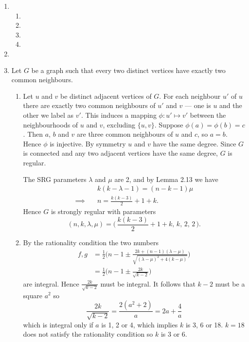 \documentclass[a4paper, 12pt]{article}
\begin{document}
\begin{enumerate}

\item \begin{enumerate}

\item 

\item

\item

\item

\end{enumerate}

\item

\item Let \(G\) be a graph such that every two distinct vertices have exactly two common neighbours.

\begin{enumerate}

\item Let \(u\) and \(v\) be distinct adjacent vertices of \(G\). For each neighbour \(u'\) of \(u\) there are exactly two common neighbours of \(u'\) and \(v\) --- one is \(u\) and the other we label as \(v'\). This induces a mapping \(\phi\colon u'\mapsto v'\) between the neighbourhoods of \(u\) and \(v\), excluding \(\{u,v\}\). Suppose \(\phi(a)=\phi(b)=c\). Then \(a\), \(b\) and \(v\) are three common neighbours of \(u\) and \(c\), so \(a=b\). Hence \(\phi\) is injective. By symmetry \(u\) and \(v\) have the same degree. Since \(G\) is connected and any two adjacent vertices have the same degree, \(G\) is regular.

The SRG parameters \(\lambda\) and \(\mu\) are 2, and by Lemma 2.13 we have
\begin{align*}
&k(k-\lambda-1)=(n-k-1)\mu\\
\implies\quad&n=\frac{k(k-3)}2+1+k.
\end{align*}
Hence \(G\) is strongly regular with parameters
\[(n,k,\lambda,\mu)=\bigg(\,\frac{k(k-3)}2+1+k,\,k,\,2,\,2\,\bigg).\]

\item By the rationality condition the two numbers
\begin{align*}
f,g&=\frac12\bigg(n-1\pm\frac{2k+(n-1)(\lambda-\mu)}{\sqrt{(\lambda-\mu)^2+4(k-\mu)}}\bigg)\\
&=\frac12\bigg(n-1\pm\frac{2k}{\sqrt{k-2}}\bigg)
\end{align*}
are integral. Hence \(\frac{2k}{\sqrt{k-2}}\) must be integral. It follows that \(k-2\) must be a square \(a^2\) so
\[\frac{2k}{\sqrt{k-2}}=\frac{2(a^2+2)}{a}=2a+\frac4a\]
which is integral only if \(a\) is 1, 2 or 4, which implies \(k\) is 3, 6 or 18. \(k=18\) does not satisfy the rationality condition so \(k\) is 3 or 6.


\end{enumerate}
\end{enumerate}
\end{document}
